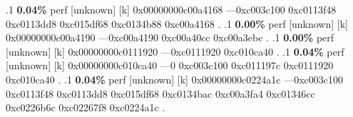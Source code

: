 \begin{profile}
{.1 \textbf{ 0.04\%} perf             [unknown]              [k] 0x00000000c00a4168\newline {} ---0xc003c100\newline {} 0xc0113f48\newline {} 0xc0113dd8\newline {} 0xc015df68\newline {} 0xc0134b88\newline {} 0xc00a4168\newline {} . 
.1 \textbf{ 0.00\%} perf             [unknown]              [k] 0x00000000c00a4190\newline {} ---0xc00a4190\newline {} 0xc00a40cc\newline {} 0xc00a3ebc\newline {} . 
.1 \textbf{ 0.00\%} perf             [unknown]              [k] 0x00000000c0111920\newline {} ---0xc0111920\newline {} 0xc010ca40\newline {} . 
.1 \textbf{ 0.04\%} perf             [unknown]              [k] 0x00000000c010ca40\newline {} ---0\newline {} 0xc003c100\newline {} 0xc011197c\newline {} 0xc0111920\newline {} 0xc010ca40\newline {} . 
.1 \textbf{ 0.04\%} perf             [unknown]              [k] 0x00000000c0224a1c\newline {} ---0xc003c100\newline {} 0xc0113f48\newline {} 0xc0113dd8\newline {} 0xc015df68\newline {} 0xc0134bac\newline {} 0xc00a3fa4\newline {} 0xc01346cc\newline {} 0xc0226b6c\newline {} 0xc02267f8\newline {} 0xc0224a1c\newline {} . 
}
\end{profile}
